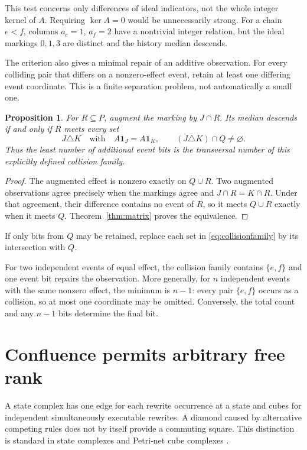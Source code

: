 \documentclass[11pt]{article}
\newtheorem{proposition}[theorem]{Proposition}
\theoremstyle{definition}
\numberwithin{equation}{section}
\begin{document}
This test concerns only differences of ideal indicators, not the
whole integer kernel of $A$. Requiring $\ker A=0$ would be
unnecessarily strong. For a chain $e<f$, columns $a_e=1$, $a_f=2$
have a nontrivial integer relation, but the ideal markings $0,1,3$
are distinct and the history median descends.

The criterion also gives a minimal repair of an additive observation.
For every colliding pair that differs on a nonzero-effect event,
retain at least one differing event coordinate. This is a
finite separation problem, not automatically a small one.

\begin{proposition}\label{prop:repair}
For $R\subseteq P$, augment the marking by $J\cap R$.
Its median descends if and only if $R$ meets every set
\begin{equation}\label{eq:collisionfamily}
 J\triangle K\quad\text{with}\quad
 A\mathbf1_J=A\mathbf1_K,\qquad (J\triangle K)\cap Q\ne\varnothing.
\end{equation}
Thus the least number of additional event bits is the transversal
number of this explicitly defined collision family.
\end{proposition}
\begin{proof}
The augmented effect is nonzero exactly on $Q\cup R$.
Two augmented observations agree precisely when the markings agree
and $J\cap R=K\cap R$. Under that agreement, their difference
contains no event of $R$, so it meets $Q\cup R$ exactly when it
meets $Q$. Theorem~\ref{thm:matrix} proves the equivalence.
\end{proof}

If only bits from $Q$ may be retained, replace each set in
\eqref{eq:collisionfamily} by its intersection with $Q$.

For two independent events of equal effect, the collision family
contains $\{e,f\}$ and one event bit repairs the observation.
More generally, for $n$ independent events with the same nonzero
effect, the minimum is $n-1$: every pair $\{e,f\}$ occurs as a
collision, so at most one coordinate may be omitted. Conversely,
the total count and any $n-1$ bits determine the final bit.

\section{Confluence permits arbitrary free rank}

A state complex has one edge for each rewrite occurrence at a
state and cubes for independent simultaneously executable rewrites.
A diamond caused by alternative competing rules does not by itself
provide a commuting square. This distinction is standard in state
complexes and Petri-net cube complexes \cite{GP,CC}.
\end{document}
